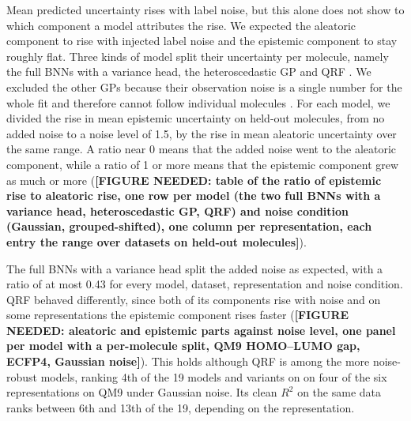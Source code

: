 
Mean predicted uncertainty rises with label noise, but this alone does not show to which component a model attributes the rise. We expected the aleatoric component to rise with injected label noise and the epistemic component to stay roughly flat. Three kinds of model split their uncertainty per molecule, namely the full BNNs with a variance head, the heteroscedastic GP and QRF \citep{kendall2017, Rasmussen2005, Meinshausen2006}. We excluded the other GPs because their observation noise is a single number for the whole fit and therefore cannot follow individual molecules \citep{Rasmussen2005}. For each model, we divided the rise in mean epistemic uncertainty on held-out molecules, from no added noise to a noise level of 1.5, by the rise in mean aleatoric uncertainty over the same range. A ratio near 0 means that the added noise went to the aleatoric component, while a ratio of 1 or more means that the epistemic component grew as much or more (\textbf{[FIGURE NEEDED: table of the ratio of epistemic rise to aleatoric rise, one row per model (the two full BNNs with a variance head, heteroscedastic GP, QRF) and noise condition (Gaussian, grouped-shifted), one column per representation, each entry the range over datasets on held-out molecules]}).

The full BNNs with a variance head split the added noise as expected, with a ratio of at most 0.43 for every model, dataset, representation and noise condition. QRF behaved differently, since both of its components rise with noise and on some representations the epistemic component rises faster (\textbf{[FIGURE NEEDED: aleatoric and epistemic parts against noise level, one panel per model with a per-molecule split, QM9 HOMO--LUMO gap, ECFP4, Gaussian noise]}). This holds although QRF is among the more noise-robust models, ranking 4th of the 19 models and variants on \aucnorm on four of the six representations on QM9 under Gaussian noise. Its clean $R^2$ on the same data ranks between 6th and 13th of the 19, depending on the representation.

